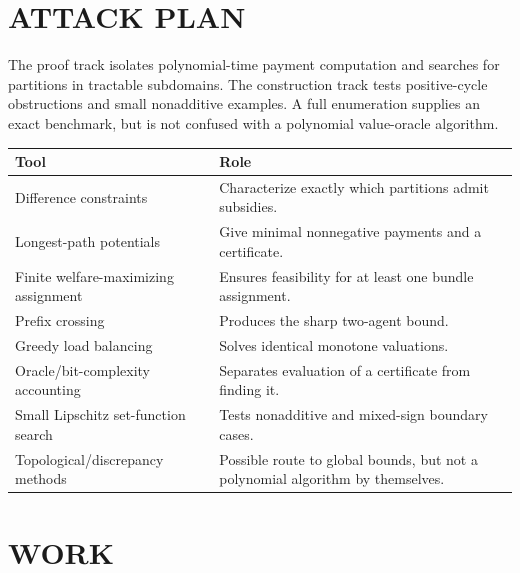 \documentclass[11pt,a4paper]{article}
\theoremstyle{remark}\newtheorem{remark}[theorem]{Remark}
\begin{document}
\section{ATTACK PLAN}
The proof track isolates polynomial-time payment computation and searches for partitions in tractable subdomains. The construction track tests positive-cycle obstructions and small nonadditive examples. A full enumeration supplies an exact benchmark, but is not confused with a polynomial value-oracle algorithm.

\begin{center}\begin{tabular}{p{.25\linewidth}p{.66\linewidth}}\toprule Tool&Role\\\midrule
Difference constraints&Characterize exactly which partitions admit subsidies.\\
Longest-path potentials&Give minimal nonnegative payments and a certificate.\\
Finite welfare-maximizing assignment&Ensures feasibility for at least one bundle assignment.\\
Prefix crossing&Produces the sharp two-agent bound.\\
Greedy load balancing&Solves identical monotone valuations.\\
Oracle/bit-complexity accounting&Separates evaluation of a certificate from finding it.\\
Small Lipschitz set-function search&Tests nonadditive and mixed-sign boundary cases.\\
Topological/discrepancy methods&Possible route to global bounds, but not a polynomial algorithm by themselves.\\\bottomrule\end{tabular}\end{center}

\section{WORK}
\end{document}
